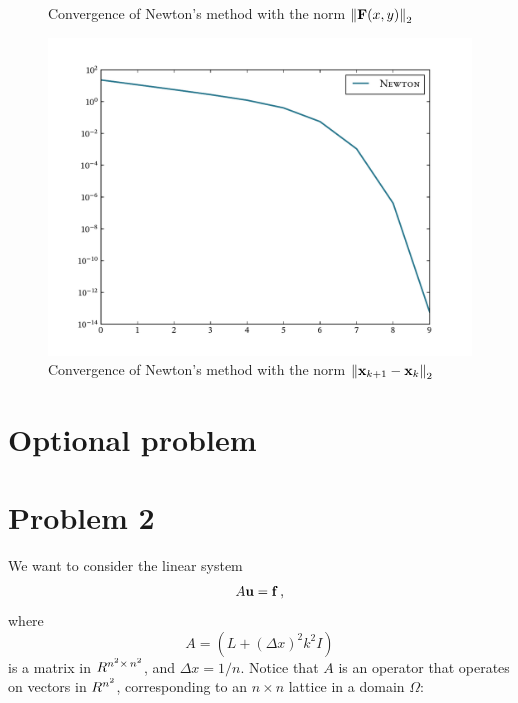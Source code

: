 \documentclass[12pt]{article}
\begin{document}
\begin{multicols}{2}
\begin{figure}[H]
        \caption{
            Convergence of Newton's method with the norm $\Norm[2]{\vec F(x, y)}$
        }
        \label{fig:f_norms}
    \end{figure}\noindent

    \begin{figure}[H]
        \centering
        \includegraphics[width=\columnwidth]{diff_norms}
        \caption{
            Convergence of Newton's method with the norm
            $\Norm[2]{\vec x_{k+1} - \vec x_k }$
        }
        \label{fig:diff_norms}
    \end{figure}\noindent


    \section*{Optional problem}



    \section*{Problem 2}
    We want to consider the linear system
    \[
        A \vec u = \vec f \,\text,
    \]
    where
    \[
        A = \left(
            L + (\Delta x)^2 k^2 I
        \right)
    \]
    is a matrix in $\R^{{n^2} \times\, {n^2}}$,
    and $\Delta x = 1/n$. Notice that $A$ is an operator
    that operates on vectors in $\R^{n^2}$, corresponding to
    an $n \times n$ lattice in a domain $\Omega$:


\end{multicols}
\end{document}
